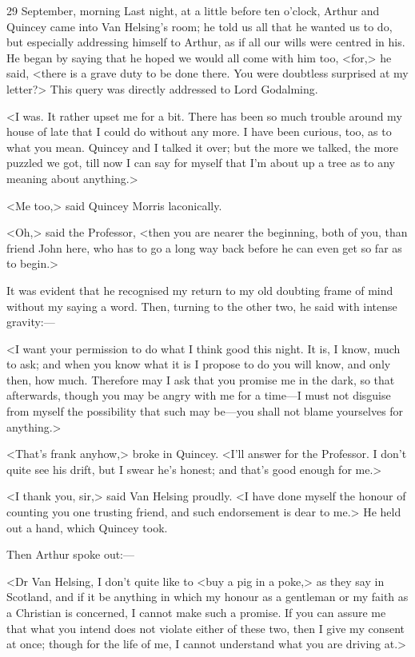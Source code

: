 \begin{diary}{29 September, morning}
Last night, at a little before ten o'clock, Arthur and Quincey came into Van Helsing's room; he told us all that he wanted us to do, but especially addressing himself to Arthur, as if all our wills were centred in his. He began by saying that he hoped we would all come with him too, <for,> he said, <there is a grave duty to be done there. You were doubtless surprised at my letter?> This query was directly addressed to Lord Godalming.

<I was. It rather upset me for a bit. There has been so much trouble around my house of late that I could do without any more. I have been curious, too, as to what you mean. Quincey and I talked it over; but the more we talked, the more puzzled we got, till now I can say for myself that I'm about up a tree as to any meaning about anything.>

<Me too,> said Quincey Morris laconically.

<Oh,> said the Professor, <then you are nearer the beginning, both of you, than friend John here, who has to go a long way back before he can even get so far as to begin.>

It was evident that he recognised my return to my old doubting frame of mind without my saying a word. Then, turning to the other two, he said with intense gravity:—

<I want your permission to do what I think good this night. It is, I know, much to ask; and when you know what it is I propose to do you will know, and only then, how much. Therefore may I ask that you promise me in the dark, so that afterwards, though you may be angry with me for a time—I must not disguise from myself the possibility that such may be—you shall not blame yourselves for anything.>

<That's frank anyhow,> broke in Quincey. <I'll answer for the Professor. I don't quite see his drift, but I swear he's honest; and that's good enough for me.>

<I thank you, sir,> said Van Helsing proudly. <I have done myself the honour of counting you one trusting friend, and such endorsement is dear to me.> He held out a hand, which Quincey took.

Then Arthur spoke out:—

<Dr Van Helsing, I don't quite like to <buy a pig in a poke,> as they say in Scotland, and if it be anything in which my honour as a gentleman or my faith as a Christian is concerned, I cannot make such a promise. If you can assure me that what you intend does not violate either of these two, then I give my consent at once; though for the life of me, I cannot understand what you are driving at.>


\end{diary}
